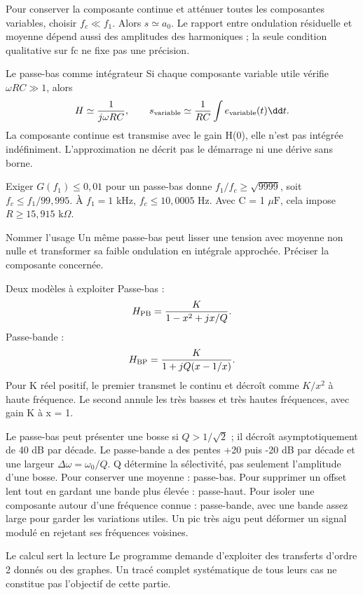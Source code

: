 Pour conserver la composante continue et atténuer toutes les composantes variables, choisir $f_c\ll f_1$. Alors $s\simeq a_0$. Le rapport entre ondulation résiduelle et moyenne dépend aussi des amplitudes des harmoniques ; la seule condition qualitative sur fc ne fixe pas une précision.
\begin{loi}{Le passe-bas comme intégrateur}
Si chaque composante variable utile vérifie $\omega RC\gg1$, alors\[H\simeq\frac1{j\omega RC},\qquad s_{\rm variable}\simeq\frac1{RC}\int e_{\rm variable}(t)\dd t.\]La composante continue est transmise avec le gain H(0), elle n’est pas intégrée indéfiniment. L’approximation ne décrit pas le démarrage ni une dérive sans borne.
\end{loi}
Exiger $G(f_1)\leq0{,}01$ pour un passe-bas donne $f_1/f_c\geq\sqrt{9999}$, soit $f_c\leq f_1/99{,}995$. À $f_1=1$ kHz, $f_c\leq10{,}0005$ Hz. Avec C = 1 $\mu\mathrm F$, cela impose $R\geq15{,}915$ k$\Omega$.
\begin{methode}{Nommer l’usage}
Un même passe-bas peut lisser une tension avec moyenne non nulle et transformer sa faible ondulation en intégrale approchée. Préciser la composante concernée.
\end{methode}


\begin{loi}{Deux modèles à exploiter}
Passe-bas :\[H_{\rm PB}=\frac{K}{1-x^2+jx/Q}.\]Passe-bande :\[H_{\rm BP}=\frac{K}{1+jQ(x-1/x)}.\]Pour K réel positif, le premier transmet le continu et décroît comme $K/x^2$ à haute fréquence. Le second annule les très basses et très hautes fréquences, avec gain K à x = 1.
\end{loi}
Le passe-bas peut présenter une bosse si $Q>1/\sqrt2$ ; il décroît asymptotiquement de 40 dB par décade. Le passe-bande a des pentes +20 puis -20 dB par décade et une largeur $\Delta\omega=\omega_0/Q$. Q détermine la sélectivité, pas seulement l’amplitude d’une bosse.
Pour conserver une moyenne : passe-bas. Pour supprimer un offset lent tout en gardant une bande plus élevée : passe-haut. Pour isoler une composante autour d’une fréquence connue : passe-bande, avec une bande assez large pour garder les variations utiles. Un pic très aigu peut déformer un signal modulé en rejetant ses fréquences voisines.
\begin{docu}{Le calcul sert la lecture}
Le programme demande d’exploiter des transferts d’ordre 2 donnés ou des graphes. Un tracé complet systématique de tous leurs cas ne constitue pas l’objectif de cette partie.
\end{docu}


